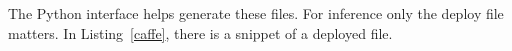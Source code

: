 The Python interface helps generate these files. For inference only the
deploy file matters. In Listing~\ref{caffe}, there is a snippet of a deployed file. 


